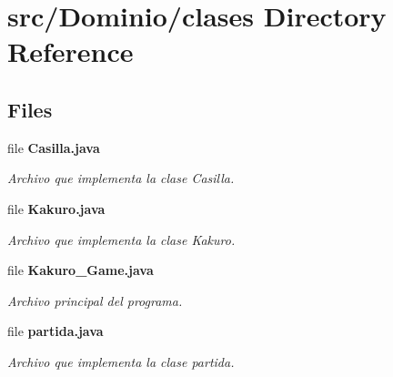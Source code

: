 \section{src/\+Dominio/clases Directory Reference}
\label{dir_b004fd07e0e40a7bdb722eaaed1b2a3f}
\subsection*{Files}
\begin{DoxyCompactItemize}
\item 
file \textbf{ Casilla.\+java}
\begin{DoxyCompactList}\small\item\em Archivo que implementa la clase Casilla. \end{DoxyCompactList}\item 
file \textbf{ Kakuro.\+java}
\begin{DoxyCompactList}\small\item\em Archivo que implementa la clase Kakuro. \end{DoxyCompactList}\item 
file \textbf{ Kakuro\+\_\+\+Game.\+java}
\begin{DoxyCompactList}\small\item\em Archivo principal del programa. \end{DoxyCompactList}\item 
file \textbf{ partida.\+java}
\begin{DoxyCompactList}\small\item\em Archivo que implementa la clase partida. \end{DoxyCompactList}\end{DoxyCompactItemize}
